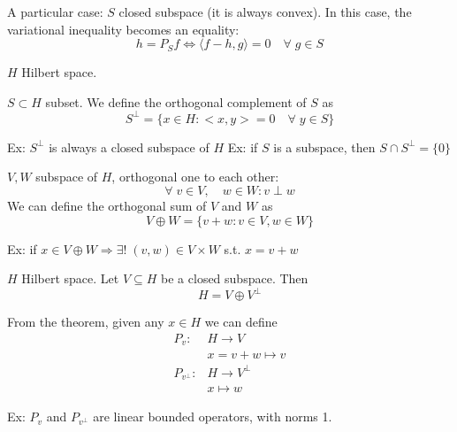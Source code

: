 \begin{remark}
    A particular case: \(S\) closed subspace (it is always convex). In this case, the variational inequality becomes an equality:
    \[
        h = P_S f \iff \langle f-h, g\rangle = 0 \quad  \forall \; g \in S
    \]
\end{remark}

\(H\) Hilbert space. 
\begin{definition}
    \(S \subset H\) subset. We define the orthogonal complement of \(S\) as 
    \[
        S^\perp = \{ x \in H: <x, y> = 0 \quad \forall\; y \in S\}
    \]
\end{definition}
Ex: \(S^\perp \) is always a closed subspace of \(H\)
Ex: if \(S\) is a subspace, then \(S \cap S^\perp = \{0\}\)

\begin{definition}
    \(V, W\) subspace of \(H\), orthogonal one to each other:
    \[
        \forall \; v \in V, \quad w \in W: v \perp w
    \]
    We can define the orthogonal sum of \(V\) and \(W\) as 
    \[
        V \oplus W = \{ v+w : v \in V, w \in W \}
    \]
\end{definition}
Ex: if \(x \in V \oplus W \Rightarrow \exists! \; (v, w) \in V \times W\) s.t. \(x=v+w\)

\begin{theorem}
    \(H\) Hilbert space. Let \(V \subseteq H\) be a closed subspace. Then 
    \[
        H = V \oplus V^\perp
    \]
\end{theorem}

\begin{definition}
    From the theorem, given any \(x \in H\) we can define
    \[
        \begin{array}{rl}
            P_v: & H \to V \\
            & x = v + w \mapsto v \\ \tag*{orthogonal projections}
            P_{v^\perp} : & H \to V^\perp \\
            & x \mapsto w
        \end{array}
    \]
\end{definition}
Ex: \(P_v \) and \(P_{v^\perp}\) are linear bounded operators, with norms 1.
